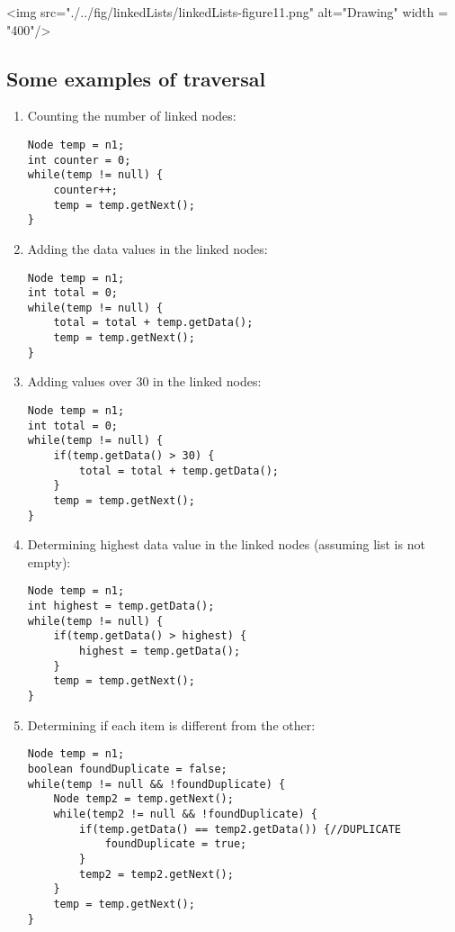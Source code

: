 \vskip 0.5cm
<img src="./../fig/linkedLists/linkedLists-figure11.png" alt="Drawing" width = "400"/>

\newpage

\subsection{Some examples of traversal}

\begin{enumerate}
\item Counting the number of linked nodes:
\begin{lstlisting}
Node temp = n1;
int counter = 0;
while(temp != null) {
	counter++;
	temp = temp.getNext();
}
\end{lstlisting}

\item Adding the data values in the linked nodes:
\begin{lstlisting}
Node temp = n1;
int total = 0;
while(temp != null) {
	total = total + temp.getData();
	temp = temp.getNext();
}
\end{lstlisting}

\item Adding values over 30 in the linked nodes:
\begin{lstlisting}
Node temp = n1;
int total = 0;
while(temp != null) {
	if(temp.getData() > 30) {
		total = total + temp.getData();
	}
	temp = temp.getNext();
}
\end{lstlisting}

\newpage

\item Determining highest data value in the linked nodes (assuming list is not empty):
\begin{lstlisting}
Node temp = n1;
int highest = temp.getData();
while(temp != null) {
	if(temp.getData() > highest) {
		highest = temp.getData();
	}
	temp = temp.getNext();
}
\end{lstlisting}

\item Determining if each item is different from the other:
\begin{lstlisting}[linewidth=14cm]
Node temp = n1;
boolean foundDuplicate = false; 
while(temp != null && !foundDuplicate) {
	Node temp2 = temp.getNext();
	while(temp2 != null && !foundDuplicate) {
		if(temp.getData() == temp2.getData()) {//DUPLICATE
			foundDuplicate = true; 
		}
		temp2 = temp2.getNext();
	}
	temp = temp.getNext();
}
\end{lstlisting}
\end{enumerate}

